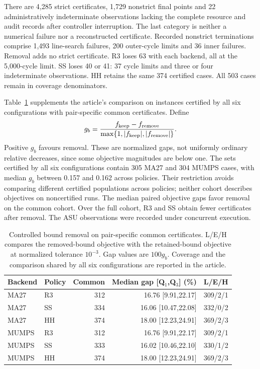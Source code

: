 \documentclass[pdflatex,sn-mathphys-num]{sn-jnl}
\theoremstyle{thmstyleone}
\theoremstyle{thmstylethree}
\begin{document}
There are 4,285 strict certificates, 1,729 nonstrict final points and 22
administratively indeterminate observations lacking the complete resource
and audit records after controller interruption. The last category is
neither a numerical failure nor a reconstructed certificate. Recorded
nonstrict terminations comprise 1,493 line-search failures, 200 outer-cycle
limits and 36 inner failures. Removal adds no strict certificate. R3 loses
63 with each backend, all at the 5,000-cycle limit. SS loses 40 or 41:
37 cycle limits and three or four indeterminate observations. HH retains
the same 374 certified cases. All 503 cases remain in coverage denominators.

Table~\ref{tab:asu-bounds-pairs} supplements the article's comparison on
instances certified by all six configurations with pair-specific common
certificates. Define
\[
 g_b=\frac{f_{\rm keep}-f_{\rm remove}}
 {\max\{1,|f_{\rm keep}|,|f_{\rm remove}|\}}.
\]
Positive $g_b$ favours removal. These are normalized gaps, not uniformly
ordinary relative decreases, since some objective magnitudes are below one.
The sets certified by all six configurations contain 305 MA27 and 304 MUMPS cases, with
median $g_b$ between 0.157 and 0.162 across policies. Their restriction
avoids comparing different certified populations across policies; neither
cohort describes objectives on noncertified runs. The median paired objective gaps favor removal on the common cohort.
Over the full cohort, R3 and SS obtain fewer certificates after removal.
The ASU observations were recorded under concurrent execution.

\begin{table}[!htbp]
\centering\small\setlength{\tabcolsep}{4pt}
\caption{Controlled bound removal on pair-specific common certificates.
L/E/H compares the removed-bound objective with the retained-bound
objective at normalized tolerance $10^{-3}$. Gap values are $100g_b$.
Coverage and the comparison shared by all six configurations are reported
in the article.}
\label{tab:asu-bounds-pairs}
\begin{tabular}{@{}llrrr@{}}
\toprule
Backend & Policy & Common & Median gap [Q$_1$,Q$_3$] (\%) & L/E/H\\
\midrule
MA27 & R3 & 312 & 16.76 [9.91,22.17] & 309/2/1\\
MA27 & SS & 334 & 16.06 [10.47,22.08] & 332/0/2\\
MA27 & HH & 374 & 18.00 [12.23,24.91] & 369/2/3\\
MUMPS & R3 & 312 & 16.76 [9.91,22.17] & 309/2/1\\
MUMPS & SS & 333 & 16.02 [10.46,22.10] & 330/1/2\\
MUMPS & HH & 374 & 18.00 [12.23,24.91] & 369/2/3\\
\bottomrule
\end{tabular}
\end{table}
\FloatBarrier
\end{document}
